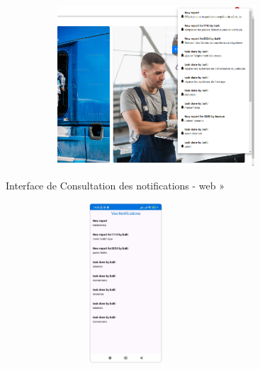 \begin{figure}[h!]
    \centering
    \begin{minipage}[t]{0.62\textwidth}
        \centering
        \includegraphics[width=1\textwidth, height=6cm]{chap5.images/notif web.png}
        \caption{Interface de Consultation des notifications - web »}
    \end{minipage}
    \hfill
    \begin{minipage}[t]{0.35\textwidth}
        \centering
        \includegraphics[width=0.8\textwidth, height=6cm]{chap5.images/notif mobile.png}
        \caption{}
    \end{minipage}
\end{figure}




\newpage
